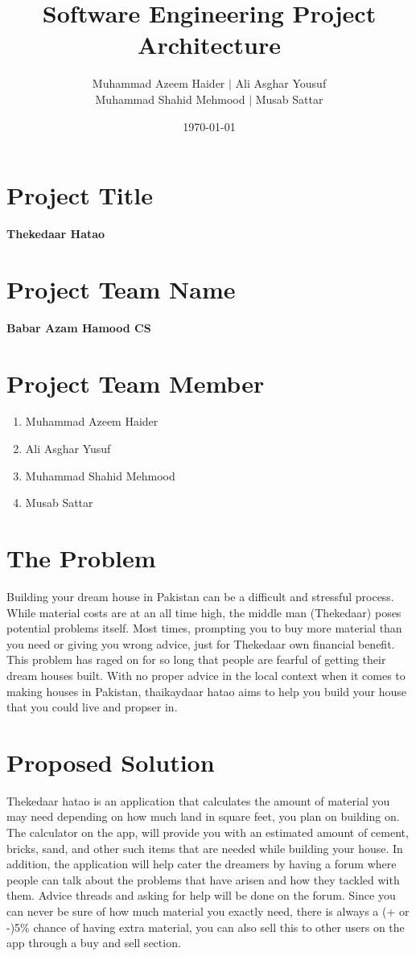 \documentclass{article}
\title{Software Engineering Project Architecture}
\author{Muhammad Azeem Haider $\mid$ Ali Asghar Yousuf \\
    Muhammad Shahid Mehmood $\mid$ Musab Sattar}
\date{\today}
\begin{document}
\maketitle

\section*{Project Title}

\textbf{Thekedaar Hatao}

\section*{Project Team Name}

\textbf{Babar Azam Hamood CS}

\section*{Project Team Member}

\begin{enumerate}
    \item Muhammad Azeem Haider
    \item Ali Asghar Yusuf
    \item Muhammad Shahid Mehmood
    \item Musab Sattar
\end{enumerate}

\section*{The Problem}

Building your dream house in Pakistan can be a difficult and stressful process.
While material costs are at an all time high, the middle man (Thekedaar) poses
potential problems itself. Most times, prompting you to buy more material than
you need or giving you wrong advice, just for Thekedaar own financial benefit.
This problem has raged on for so long that people are fearful of getting their
dream houses built. With no proper advice in the local context when it comes to
making houses in Pakistan, thaikaydaar hatao aims to help you build your house
that you could live and propser in.

\section*{Proposed Solution}

Thekedaar hatao is an application that calculates the amount of material you
may need depending on how much land in square feet, you plan on building on.
The calculator on the app, will provide you with an estimated amount of cement,
bricks, sand, and other such items that are needed while building your house.
In addition, the application will help cater the dreamers by having a forum
where people can talk about the problems that have arisen and how they tackled
with them. Advice threads and asking for help will be done on the forum. Since
you can never be sure of how much material you exactly need, there is always a
(+ or -)5\% chance of having extra material, you can also sell this to other
users on the app through a buy and sell section.
\end{document}
